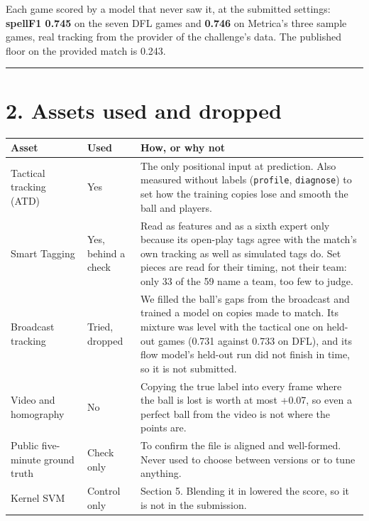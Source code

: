 \documentclass[10pt,a4paper]{article}
\begin{document}
Each game scored by a model that never saw it, at the submitted settings: \textbf{spellF1 0.745} on
the seven DFL games and \textbf{0.746} on Metrica's three sample games, real tracking from the
provider of the challenge's data. The published floor on the provided match is 0.243.


\medskip\hrule\medskip


\section*{2. Assets used and dropped}


{\footnotesize
\begin{longtable}{>{\raggedright\arraybackslash}p{}>{\raggedright\arraybackslash}p{}>{\raggedright\arraybackslash}p{}}
\toprule
{}\textbf{Asset} & {}\textbf{Used} & {}\textbf{How, or why not} \\
\midrule
\endhead
{}Tactical tracking (ATD) & {}Yes & {}The only positional input at prediction. Also measured without labels (\texttt{profile}, \texttt{diagnose}) to set how the training copies lose and smooth the ball and players. \\
\addlinespace[3pt]
{}Smart Tagging & {}Yes, behind a check & {}Read as features and as a sixth expert only because its open-play tags agree with the match's own tracking as well as simulated tags do. Set pieces are read for their timing, not their team: only 33 of the 59 name a team, too few to judge. \\
\addlinespace[3pt]
{}Broadcast tracking & {}Tried, dropped & {}We filled the ball's gaps from the broadcast and trained a model on copies made to match. Its mixture was level with the tactical one on held-out games (0.731 against 0.733 on DFL), and its flow model's held-out run did not finish in time, so it is not submitted. \\
\addlinespace[3pt]
{}Video and homography & {}No & {}Copying the true label into every frame where the ball is lost is worth at most +0.07, so even a perfect ball from the video is not where the points are. \\
\addlinespace[3pt]
{}Public five-minute ground truth & {}Check only & {}To confirm the file is aligned and well-formed. Never used to choose between versions or to tune anything. \\
\addlinespace[3pt]
{}Kernel SVM & {}Control only & {}Section 5. Blending it in lowered the score, so it is not in the submission. \\
\bottomrule
\end{longtable}
}
\end{document}
